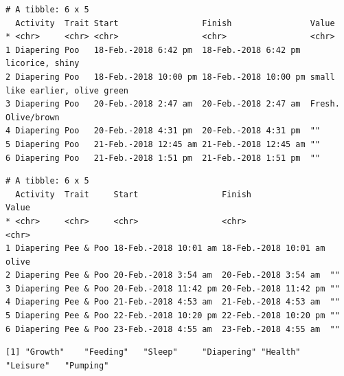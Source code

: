 \documentclass[10,portrait]{article}
\newenvironment{Shaded}{\begin{snugshade}}{\end{snugshade}}
\newcommand{\KeywordTok}[1]{\textcolor[rgb]{0.13,0.29,0.53}{\textbf{#1}}}
\newcommand{\DataTypeTok}[1]{\textcolor[rgb]{0.13,0.29,0.53}{#1}}
\newcommand{\DecValTok}[1]{\textcolor[rgb]{0.00,0.00,0.81}{#1}}
\newcommand{\StringTok}[1]{\textcolor[rgb]{0.31,0.60,0.02}{#1}}
\newcommand{\CommentTok}[1]{\textcolor[rgb]{0.56,0.35,0.01}{\textit{#1}}}
\newcommand{\OperatorTok}[1]{\textcolor[rgb]{0.81,0.36,0.00}{\textbf{#1}}}
\newcommand{\NormalTok}[1]{#1}
\begin{document}
\begin{verbatim}
# A tibble: 6 x 5
  Activity  Trait Start                 Finish                Value                          
* <chr>     <chr> <chr>                 <chr>                 <chr>                          
1 Diapering Poo   18-Feb.-2018 6:42 pm  18-Feb.-2018 6:42 pm  licorice, shiny                
2 Diapering Poo   18-Feb.-2018 10:00 pm 18-Feb.-2018 10:00 pm small like earlier, olive green
3 Diapering Poo   20-Feb.-2018 2:47 am  20-Feb.-2018 2:47 am  Fresh. Olive/brown             
4 Diapering Poo   20-Feb.-2018 4:31 pm  20-Feb.-2018 4:31 pm  ""                             
5 Diapering Poo   21-Feb.-2018 12:45 am 21-Feb.-2018 12:45 am ""                             
6 Diapering Poo   21-Feb.-2018 1:51 pm  21-Feb.-2018 1:51 pm  ""                             
\end{verbatim}

\begin{Shaded}
\end{Shaded}

\begin{verbatim}
# A tibble: 6 x 5
  Activity  Trait     Start                 Finish                Value
* <chr>     <chr>     <chr>                 <chr>                 <chr>
1 Diapering Pee & Poo 18-Feb.-2018 10:01 am 18-Feb.-2018 10:01 am olive
2 Diapering Pee & Poo 20-Feb.-2018 3:54 am  20-Feb.-2018 3:54 am  ""   
3 Diapering Pee & Poo 20-Feb.-2018 11:42 pm 20-Feb.-2018 11:42 pm ""   
4 Diapering Pee & Poo 21-Feb.-2018 4:53 am  21-Feb.-2018 4:53 am  ""   
5 Diapering Pee & Poo 22-Feb.-2018 10:20 pm 22-Feb.-2018 10:20 pm ""   
6 Diapering Pee & Poo 23-Feb.-2018 4:55 am  23-Feb.-2018 4:55 am  ""   
\end{verbatim}

\begin{Shaded}
\end{Shaded}

\begin{verbatim}
[1] "Growth"    "Feeding"   "Sleep"     "Diapering" "Health"    "Leisure"   "Pumping"  
\end{verbatim}
\end{document}

